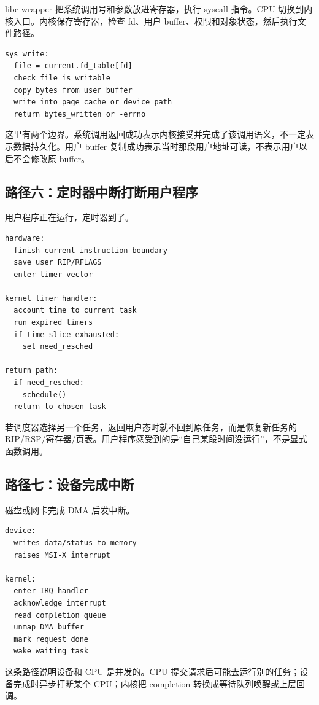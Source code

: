 libc wrapper 把系统调用号和参数放进寄存器，执行 syscall 指令。CPU 切换到内核入口。内核保存寄存器，检查 fd、用户 buffer、权限和对象状态，然后执行文件路径。

\begin{lstlisting}
sys_write:
  file = current.fd_table[fd]
  check file is writable
  copy bytes from user buffer
  write into page cache or device path
  return bytes_written or -errno
\end{lstlisting}

这里有两个边界。系统调用返回成功表示内核接受并完成了该调用语义，不一定表示数据持久化。用户 buffer 复制成功表示当时那段用户地址可读，不表示用户以后不会修改原 buffer。

\subsection{路径六：定时器中断打断用户程序}

用户程序正在运行，定时器到了。

\begin{lstlisting}
hardware:
  finish current instruction boundary
  save user RIP/RFLAGS
  enter timer vector

kernel timer handler:
  account time to current task
  run expired timers
  if time slice exhausted:
    set need_resched

return path:
  if need_resched:
    schedule()
  return to chosen task
\end{lstlisting}

若调度器选择另一个任务，返回用户态时就不回到原任务，而是恢复新任务的 RIP/RSP/寄存器/页表。用户程序感受到的是“自己某段时间没运行”，不是显式函数调用。

\subsection{路径七：设备完成中断}

磁盘或网卡完成 DMA 后发中断。

\begin{lstlisting}
device:
  writes data/status to memory
  raises MSI-X interrupt

kernel:
  enter IRQ handler
  acknowledge interrupt
  read completion queue
  unmap DMA buffer
  mark request done
  wake waiting task
\end{lstlisting}

这条路径说明设备和 CPU 是并发的。CPU 提交请求后可能去运行别的任务；设备完成时异步打断某个 CPU；内核把 completion 转换成等待队列唤醒或上层回调。

